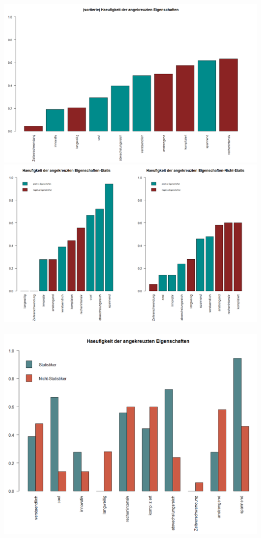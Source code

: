 \documentclass[12pt,a4paper,titlepage=true,parskip,ngerman]{scrartcl}
\begin{document}
\includegraphics[scale=0.48]{sort_pos_neg_Hfgkeit_angekreuzter_Eigenschaften}\\	
\includegraphics[scale=0.5]{(nicht)-statis_sort_pos_neg_Hfgkeit_angekreuzter_Eigenschaften}\\
\vspace{0.2cm}\\
\includegraphics[scale=0.5]{(nicht)-statis_Hfgkeit_angekreuzter_Eigenschaften}\\
\end{document}
